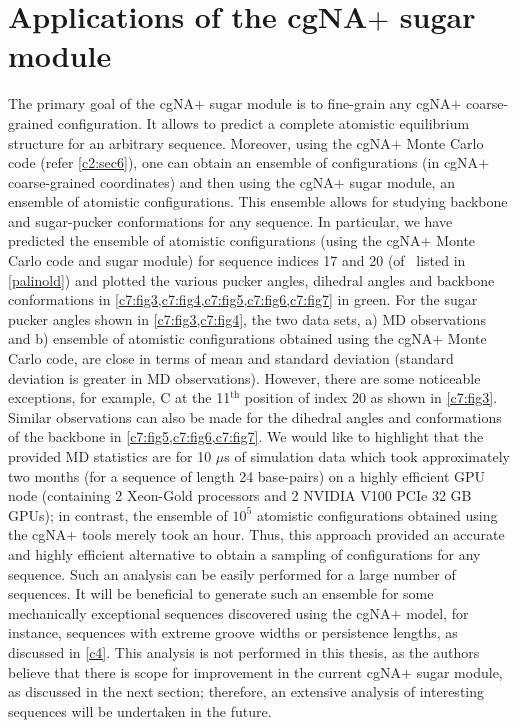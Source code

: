 \section{Applications of the cgNA$+$ sugar module}
The primary goal of the cgNA$+$ sugar module is to fine-grain any cgNA$+$ coarse-grained configuration.
It allows to predict a complete atomistic equilibrium structure for an arbitrary sequence.
Moreover, using the cgNA$+$ Monte Carlo code (refer \cref{c2:sec6}), one can obtain an ensemble of configurations (in cgNA$+$ coarse-grained coordinates) and then using the cgNA$+$ sugar module, an ensemble of atomistic configurations.
This ensemble allows for studying backbone and sugar-pucker conformations for any sequence.
In particular, we have predicted the ensemble of atomistic configurations (using the cgNA$+$ Monte Carlo code and sugar module) for sequence indices 17 and 20 (of \Lbdna \ listed in \cref{palinold}) and plotted the various pucker angles, dihedral angles and backbone conformations in \cref{c7:fig3,c7:fig4,c7:fig5,c7:fig6,c7:fig7} in green.
For the sugar pucker angles shown in \cref{c7:fig3,c7:fig4}, the two data sets, a) MD observations and b) ensemble of atomistic configurations obtained using the cgNA$+$ Monte Carlo code, are close in terms of mean and standard deviation (standard deviation is greater in MD observations).
However, there are some noticeable exceptions, for example, C at the 11$^\text{th}$ position of index 20 as shown in \cref{c7:fig3}.
Similar observations can also be made for the dihedral angles and conformations of the backbone in \cref{c7:fig5,c7:fig6,c7:fig7}.
We would like to highlight that the provided MD statistics are for 10 $\mu$s of simulation data which took approximately two months (for a sequence of length 24 base-pairs) on a highly efficient GPU node (containing 2 Xeon-Gold processors and 2 NVIDIA V100 PCIe 32 GB GPUs); in contrast, the ensemble of $10^5$ atomistic configurations obtained using the cgNA$+$ tools merely took an hour.
Thus, this approach provided an accurate and highly efficient alternative to obtain a sampling of configurations for any sequence.
Such an analysis can be easily performed for a large number of sequences.
It will be beneficial to generate such an ensemble for some mechanically exceptional sequences discovered using the cgNA$+$ model, for instance, sequences with extreme groove widths or persistence lengths, as discussed in \cref{c4}.
This analysis is not performed in this thesis, as the authors believe that there is scope for improvement in the current cgNA$+$ sugar module, as discussed in the next section; therefore, an extensive analysis of interesting sequences will be undertaken in the future.

